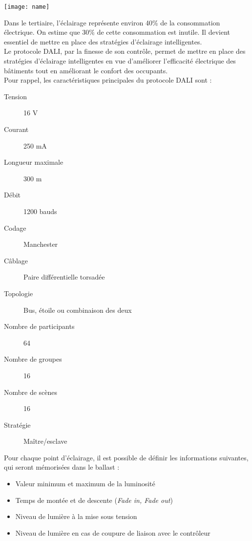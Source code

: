 \begin{center}
	\texttt{[image: name]}
\end{center}


Dans le tertiaire, l'éclairage représente environ 40\% de la consommation électrique. On estime que 30\% de cette consommation est inutile. Il devient essentiel de mettre en place des stratégies d'éclairage intelligentes.\\

Le protocole DALI, par la finesse de son contrôle, permet de mettre en place des stratégies d'éclairage intelligentes en vue d'améliorer l'efficacité électrique des bâtiments tout en améliorant le confort des occupants.\\

Pour rappel, les caractéristiques principales du protocole DALI sont :

\begin{multicols}{3}
	\begin{description}
\item[Tension] 16 V
\item[Courant] 250 mA
\item[Longueur maximale] 300 m
\item[Débit] 1200 bauds
\item[Codage] Manchester
\item[Câblage] Paire différentielle torsadée
\item[Topologie] Bus, étoile ou combinaison des deux
\item[Nombre de participants] 64
\item[Nombre de groupes] 16
\item[Nombre de scènes] 16
\item[Stratégie] Maître/esclave
\end{description}
\end{multicols}

Pour chaque point d'éclairage, il est possible de définir les informations suivantes, qui seront mémorisées dans le ballast :
\begin{itemize}
	\item Valeur minimum et maximum de la luminosité
	\item Temps de montée et de descente (\textit{Fade in, Fade out})
	\item Niveau de lumière à la mise sous tension
	\item Niveau de lumière en cas de coupure de liaison avec le contrôleur
\end{itemize}

